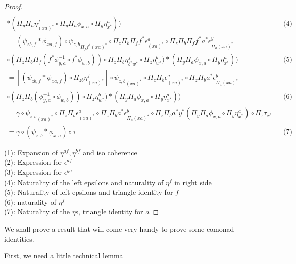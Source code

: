 \documentclass[10pt, oneside]{article}
\begin{document}
\begin{proof}
\begin{align*}
        \\ \ast (\Pi_y \Pi_a \eta^f_{(xa)^\ast} \circ \Pi_y \Pi_a \phi_{x, a} \circ  \Pi_y \eta^{a}_{x^\ast})) && \text{(4)}
        \\ = (\psi_{zb, f} \ast \phi_{xa, f}) \circ {\psi_{z, b}}_{\Pi_f f^\ast (xa)^\ast} \circ \Pi_z \Pi_b \Pi_f f^\ast \epsilon^a_{(xa)^\ast} \circ \Pi_z \Pi_b \Pi_f f^\ast a^\ast \epsilon^y_{\Pi_ a (xa)^\ast}
        \\ \circ (\Pi_z \Pi_b \Pi_f (f^\ast \phi^{-1}_{y, a} \circ f^\ast \phi_{w, b})) \circ \Pi_z \Pi_b \eta^f_{b^\ast w^\ast} \circ \Pi_z \eta^b_{w^\ast}) \ast (\Pi_y \Pi_a \phi_{x, a} \circ  \Pi_y \eta^{a}_{x^\ast})) && \text{(5)}
        \\ = [ (\psi_{zb, f} \ast \phi_{xa, f}) \circ \Pi_{zb} \eta^f_{(xa)^\ast}] \circ {\psi_{z, b}}_{(xa)^\ast} \circ \Pi_z \Pi_b \epsilon^a_{(xa)^\ast} \circ \Pi_z \Pi_b a^\ast \epsilon^y_{\Pi_ a (xa)^\ast}
        \\ \circ (\Pi_z \Pi_b (\phi^{-1}_{y, a} \circ \phi_{w, b})) \circ \Pi_z \eta^b_{w^\ast}) \ast (\Pi_y \Pi_a \phi_{x, a} \circ  \Pi_y \eta^{a}_{x^\ast})) && \text{(6)}
        \\ = \gamma \circ {\psi_{z, b}}_{(xa)^\ast} \circ \Pi_z \Pi_b \epsilon^a_{(xa)^\ast} \circ \Pi_z \Pi_b a^\ast \epsilon^y_{\Pi_a (xa)^\ast} \circ \Pi_z \Pi_b a^\ast y^\ast (\Pi_y \Pi_a \phi_{x, a} \circ \Pi_y \eta^{a}_{x^\ast}) \circ \Pi_z \tau_{x^\ast}
        \\ = \gamma\circ (\psi_{z, b} \ast \phi_{x, a}) \circ \tau && \text{(7)}
    \end{align*}


\noindent
(1): Expansion of $\eta^{af}, \eta^{bf}$ and iso coherence \\
(2): Expression for $\epsilon^{df}$ \\
(3): Expression for $\epsilon^{ya}$ \\
(4): Naturality of the left epsilons and naturality of $\eta^f$ in right side \\
(5): Naturality of left epsilons and triangle identity for $f$ \\
(6): naturality of $\eta^f$ \\
(7): Naturality of the $\eta$s, triangle identity for $a$
\end{proof}

We shall prove a result that will come very handy to prove some comonad identities. 

First, we need a little technical lemma
\end{document}
